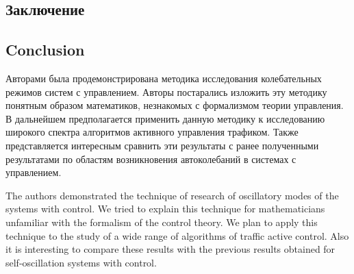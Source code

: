 \begin{Russian}
\section{Заключение}
\end{Russian}
\begin{English}
\section{Conclusion}
\end{English}
\label{sec:conclusion}

\begin{Russian}
Авторами была продемонстрирована методика исследования колебательных
режимов систем с управлением. Авторы постарались изложить эту методику
понятным образом математиков, незнакомых с формализмом теории
управления. В дальнейшем предполагается применить данную методику к
исследованию широкого спектра алгоритмов активного управления
трафиком. Также представляется интересным сравнить эти результаты с ранее
полученными результатами по областям возникновения автоколебаний в
системах с управлением.
\end{Russian}
\begin{English}
The authors demonstrated the technique of research of oscillatory
modes of the systems with control. We tried to explain this technique
for mathematicians unfamiliar with the formalism of the control theory. 
We plan to apply this technique to
the study of a wide range of algorithms of traffic active control. 
Also it is interesting to compare these results with the previous
results obtained for self-oscillation systems with control.
\end{English}


